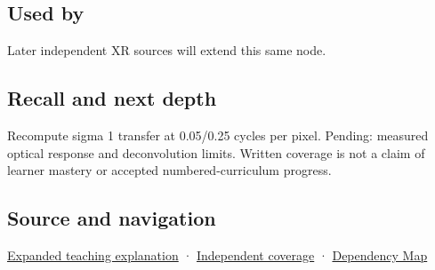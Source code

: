 \subsection{Used by}\label{appendix-8b76b0efd27f-used-by}

Later independent XR sources will extend this same node.

\subsection{Recall and next depth}\label{appendix-8b76b0efd27f-recall-and-next-depth}

Recompute sigma 1 transfer at 0.05/0.25 cycles per pixel. Pending: measured optical response and deconvolution limits. Written coverage is not a claim of learner mastery or accepted numbered-curriculum progress.

\subsection{Source and navigation}\label{appendix-8b76b0efd27f-source-and-navigation}

\hyperref[04-visual-computing-ii-ch042-a-footprint-is-more-meaningful-than-an-isolated-pixel-center]{Expanded teaching explanation} · \hyperref[appendix-fd090d982a15-xr01---independent-seeing-and-representation-source]{Independent coverage} · \hyperref[appendix-4ad47bdd269a]{Dependency Map}
